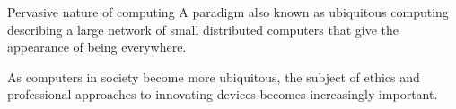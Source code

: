 \documentclass[]{DefinitionFormat}
\begin{document}
\begin{definition}{Pervasive nature of computing}
A paradigm also known as ubiquitous computing describing a large network of small distributed computers that give the appearance of being everywhere.

As computers in society become more ubiquitous, the subject of ethics and professional approaches to innovating devices becomes increasingly important.
\end{definition}
\end{document}
